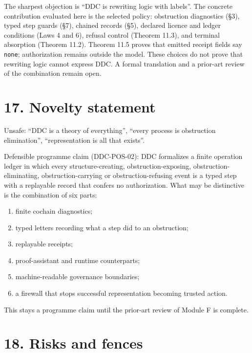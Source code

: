 \documentclass[
  11pt,
]{article}
\providecommand{\tightlist}{%
  \setlength{\itemsep}{0pt}\setlength{\parskip}{0pt}}
\renewcommand{\_}{\ddcunderscore\allowbreak}
\begin{document}
The sharpest objection is ``DDC is rewriting logic with labels''. The
concrete contribution evaluated here is the selected policy: obstruction
diagnostics (§3), typed step guards (§7), chained records (§5), declared
licence and ledger conditions (Laws 4 and 6), refusal control (Theorem
11.3), and terminal absorption (Theorem 11.2). Theorem 11.5 proves that
emitted receipt fields say \texttt{none}; authorization remains outside
the model. These choices do not prove that rewriting logic cannot
express DDC. A formal translation and a prior-art review of the
combination remain open.

\section{17. Novelty statement}\label{novelty-statement}

Unsafe: ``DDC is a theory of everything'', ``every process is
obstruction elimination'', ``representation is all that exists''.

Defensible programme claim (DDC-POS-02): DDC formalizes a finite
operation ledger in which every structure-creating,
obstruction-exposing, obstruction-eliminating, obstruction-carrying or
obstruction-refusing event is a typed step with a replayable record that
confers no authorization. What may be distinctive is the combination of
six parts:

\begin{enumerate}
\def\labelenumi{\arabic{enumi}.}
\tightlist
\item
  finite cochain diagnostics;
\item
  typed letters recording what a step did to an obstruction;
\item
  replayable receipts;
\item
  proof-assistant and runtime counterparts;
\item
  machine-readable governance boundaries;
\item
  a firewall that stops successful representation becoming trusted
  action.
\end{enumerate}

This stays a programme claim until the prior-art review of Module F is
complete.

\section{18. Risks and fences}\label{risks-and-fences}
\end{document}
